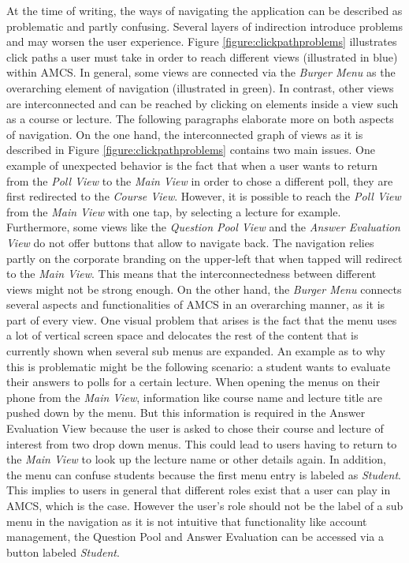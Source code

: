 At the time of writing, the ways of navigating the application can be described as problematic and partly confusing. Several layers of indirection introduce problems and may worsen the user experience.
Figure \ref{figure:clickpathproblems} illustrates click paths a user must take in order to reach different views (illustrated in blue) within AMCS. In general, some views are connected via the \emph{Burger Menu} as the overarching element of navigation (illustrated in green). In contrast, other views are interconnected and can be reached by clicking on elements inside a view such as a course or lecture. The following paragraphs elaborate more on both aspects of navigation.
\newline
\newline
On the one hand, the interconnected graph of views as it is described in Figure \ref{figure:clickpathproblems} contains two main issues. One example of unexpected behavior is the fact that when a user wants to return from the \emph{Poll View} to the \emph{Main View} in order to chose a different poll, they are first redirected to the \emph{Course View}. However, it is possible to reach the \emph{Poll View} from the \emph{Main View} with one tap, by selecting a lecture for example. Furthermore, some views like the \emph{Question Pool View} and the \emph{Answer Evaluation View} do not offer buttons that allow to navigate back. The navigation relies partly on the corporate branding on the upper-left that when tapped will redirect to the \emph{Main View}.
This means that the interconnectedness between different views might not be strong enough.
\newline
\newline
On the other hand, the \emph{Burger Menu} connects several aspects and functionalities of AMCS in an overarching manner, as it is part of every view.  
One visual problem that arises is the fact that the menu uses a lot of vertical screen space and delocates the rest of the content that is currently shown when several sub menus are expanded. An example as to why this is problematic might be the following scenario: a student wants to evaluate their answers to polls for a certain lecture. When opening the menus on their phone from the \emph{Main View}, information like course name and lecture title are pushed down by the menu. But this information is required in the Answer Evaluation View because the user is asked to chose their course and lecture of interest from two drop down menus. This could lead to users having to return to the \emph{Main View} to look up the lecture name or other details again.
In addition, the menu can confuse students because the first menu entry is labeled as \emph{Student}. This implies to users in general that different roles exist that a user can play in AMCS, which is the case. However the user's role should not be the label of a sub menu in the navigation as it is not intuitive that functionality like account management, the Question Pool and Answer Evaluation can be accessed via a button labeled \emph{Student}.


